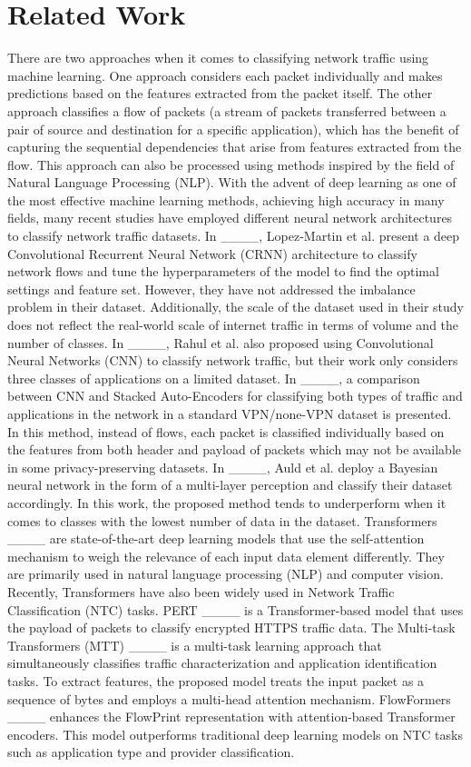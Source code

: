\section{Related Work}
There are two approaches when it comes to classifying network traffic using machine learning. One approach considers each packet individually and makes predictions based on the features extracted from the packet itself. The other approach classifies a flow of packets (a stream of packets transferred between a pair of source and destination for a specific application), which has the benefit of capturing the sequential dependencies that arise from features extracted from the flow. This approach can also be processed using methods inspired by the field of Natural Language Processing (NLP). With the advent of deep learning as one of the most effective machine learning methods, achieving high accuracy in many fields, many recent studies have employed different neural network architectures to classify network traffic datasets. In ____, Lopez-Martin et al. present a deep Convolutional Recurrent Neural Network (CRNN) architecture to classify network flows and tune the hyperparameters of the model to find the optimal settings and feature set. However, they have not addressed the imbalance problem in their dataset. Additionally, the scale of the dataset used in their study does not reflect the real-world scale of internet traffic in terms of volume and the number of classes. In ____, Rahul et al. also proposed using Convolutional Neural Networks (CNN) to classify network traffic, but their work only considers three classes of applications on a limited dataset. In ____, a comparison between CNN and Stacked Auto-Encoders for classifying both types of traffic and applications in the network in a standard VPN/none-VPN dataset is presented. In this method, instead of flows, each packet is classified individually based on the features from both header and payload of packets which may not be available in some privacy-preserving datasets. In ____, Auld et al. deploy a Bayesian neural network in the form of a multi-layer perception and classify their dataset accordingly. In this work, the proposed method tends to underperform when it comes to classes with the lowest number of data in the dataset. 
Transformers ____ are state-of-the-art deep learning models that use the self-attention mechanism to weigh the relevance of each input data element differently. They are primarily used in natural language processing (NLP) and computer vision. Recently, Transformers have also been widely used in Network Traffic Classification (NTC) tasks. PERT ____ is a Transformer-based model that uses the payload of packets to classify encrypted HTTPS traffic data. The Multi-task Transformers (MTT) ____ is a multi-task learning approach that simultaneously classifies traffic characterization and application identification tasks. To extract features, the proposed model treats the input packet as a sequence of bytes and employs a multi-head attention mechanism. FlowFormers ____ enhances the FlowPrint representation with attention-based Transformer encoders. This model outperforms traditional deep learning models on NTC tasks such as application type and provider classification.

